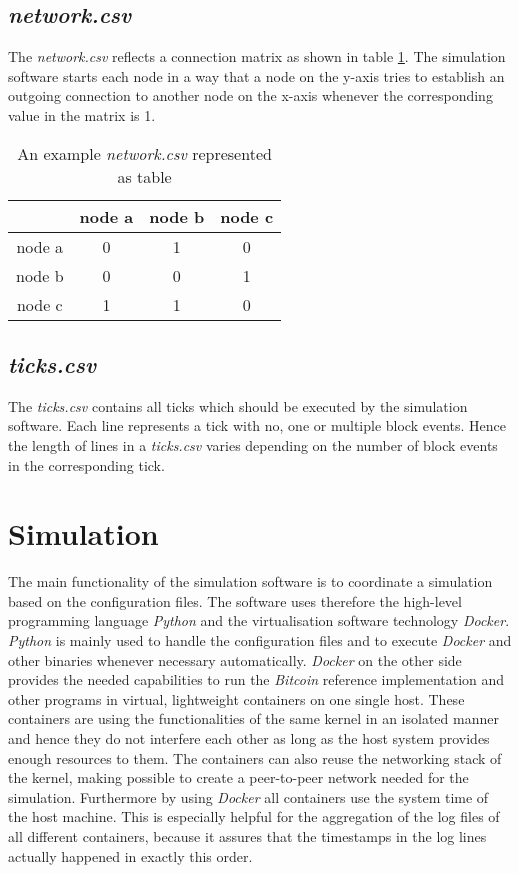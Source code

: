 \subsection{\textit{network.csv}}
The \textit{network.csv} reflects a connection matrix as shown in table \ref{tab:network_csv}.
The simulation software starts each node in a way that a node on the y-axis tries to establish an outgoing connection to another node on the x-axis whenever the corresponding value in the matrix is 1.

\begin{table}
  \centering
  \begin{tabular}{c|ccc}
    			& node a 	& node b	& node c	\\
    \hline
    node a		& 0			& 1         & 0         \\
    node b      & 0         & 0         & 1			\\
    node c      & 1         & 1			& 0         \\
  \end{tabular}
  \caption{An example \textit{network.csv} represented as table}
  \label{tab:network_csv}
\end{table}

\subsection{\textit{ticks.csv}}

The \textit{ticks.csv} contains all ticks which should be executed by the simulation software.
Each line represents a tick with no, one or multiple block events.
Hence the length of lines in a \textit{ticks.csv} varies depending on the number of block events in the corresponding tick.

\section{Simulation}
\label{chap:simulation}

The main functionality of the simulation software is to coordinate a simulation based on the configuration files.
The software uses therefore the high-level programming language \textit{Python} and the virtualisation software technology \textit{Docker}.
\textit{Python} is mainly used to handle the configuration files and to execute \textit{Docker} and other binaries whenever necessary automatically.
\textit{Docker} on the other side provides the needed capabilities to run the \textit{Bitcoin} reference implementation and other programs in virtual, lightweight containers on one single host.
These containers are using the functionalities of the same kernel in an isolated manner and hence they do not interfere each other as long as the host system provides enough resources to them.
The containers can also reuse the networking stack of the kernel, making possible to create a peer-to-peer network needed for the simulation.
Furthermore by using \textit{Docker} all containers use the system time of the host machine.
This is especially helpful for the aggregation of the log files of all different containers, because it assures that the timestamps in the log lines actually happened in exactly this order.
	

